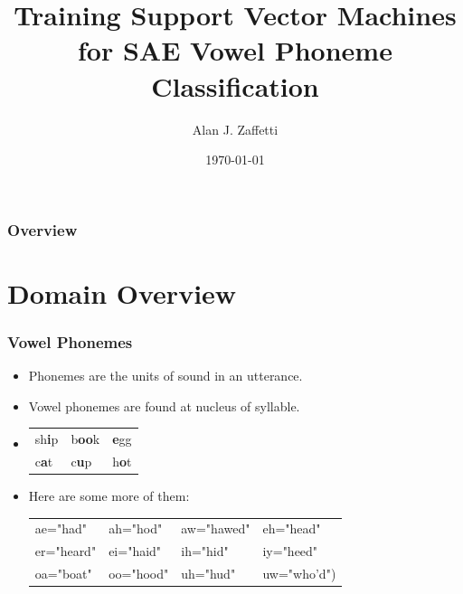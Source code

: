 \documentclass{beamer}
\title[Vowel Classification]{Training Support Vector Machines for SAE Vowel Phoneme Classification} %
\author{Alan J. Zaffetti} %
\institute[UMASS Amherst] %
{
University of Massachusetts Amherst \\ %
\medskip
\textit{azaffett@umass.edu} %
}
\date{\today} %
\begin{document}
\begin{frame}
\titlepage %
\end{frame}

\begin{frame}
\frametitle{Overview} %
\tableofcontents %
\end{frame}


\section{Domain Overview} %

\begin{frame}
\frametitle{Vowel Phonemes}
\begin{itemize}
\item Phonemes are the units of sound in an utterance.
\item Vowel phonemes are found at nucleus of syllable.
\item \begin{tabular}{lll}
sh\textbf{i}p & b\textbf{oo}k & \textbf{e}gg \\
c\textbf{a}t & c\textbf{u}p & h\textbf{o}t 
\end{tabular}
\item Here are some more of them:
\begin{tabular}{llll}
ae="had" & ah="hod" & aw="hawed" & eh="head" \\
er="heard" & ei="haid" & ih="hid" & iy="heed" \\
oa="boat" & oo="hood" & uh="hud" & uw="who'd")
\end{tabular}
\end{itemize}
\end{frame}
\end{document}
